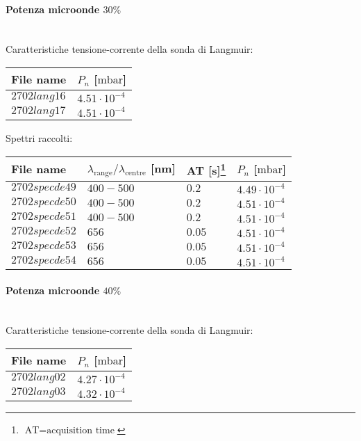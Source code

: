\paragraph*{Potenza microonde $\text{30\%}$} ~\\
Caratteristiche tensione-corrente della sonda di Langmuir:
\begin{center}
  \begin{tabular}{p{3cm}p{3cm}}
  \toprule
File name	&$P_{n}$ [$\si{\milli\bar}$]\\
  \midrule
$2702lang16$	&$4.51\cdot10^{-4}$\\
$2702lang17$	&$4.51\cdot10^{-4}$\\

  \bottomrule
  \end{tabular}
\end{center}

Spettri raccolti:
\begin{center}
\begin{tabular}{p{3cm}p{4cm}p{2cm}p{3cm}}
\toprule
File name	&$\lambda_\text{range}\text{/}\lambda_\text{centre}$ [nm] &AT [s]\footnote{$\text{AT}=\text{acquisition time}$} &$P_{n}$ [$\si{\milli\bar}$]\\
\midrule
$2702specde49$	&$400-500$	&$0.2$		&$4.49\cdot10^{-4}$\\
$2702specde50$	&$400-500$	&$0.2$		&$4.51\cdot10^{-4}$\\
$2702specde51$	&$400-500$	&$0.2$		&$4.51\cdot10^{-4}$\\
$2702specde52$	&$656$		&$0.05$		&$4.51\cdot10^{-4}$\\
$2702specde53$	&$656$		&$0.05$		&$4.51\cdot10^{-4}$\\
$2702specde54$	&$656$		&$0.05$		&$4.51\cdot10^{-4}$\\

\bottomrule
\end{tabular}
\end{center}

\paragraph*{Potenza microonde $\text{40\%}$} ~\\
Caratteristiche tensione-corrente della sonda di Langmuir:
\begin{center}
\begin{tabular}{p{3cm}p{3cm}}
\toprule
File name	&$P_n$ [$\si{\milli\bar}$]\\
\midrule
$2702lang02$	&$4.27\cdot10^{-4}$\\
$2702lang03$	&$4.32\cdot10^{-4}$\\
\bottomrule
\end{tabular}
\end{center}

